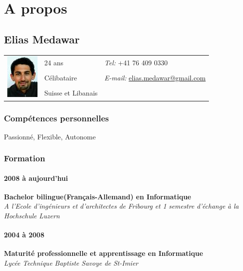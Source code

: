 \documentclass[12pt,a4paper,twoside]{report}
\begin{document}



\cleardoublepage
\chapter{A propos }

\cleardoublepage
\section{Elias Medawar}
	\begin{tabular}[t]{@{}p{2cm}p{5cm}p{8cm}}
	\multirow{3}{*}{\includegraphics[scale=0.8]{../comon/figures/elias.jpg} } & 24 ans & \textit{Tel:} +41 76 409 0330 \\[0.4cm]
	& Célibataire & \textit{E-mail:} \url{elias.medawar@gmail.com}\\[0.4cm]
  	& Suisse et Libanais\\[0.5cm]
	\end{tabular}
\subsection{Compétences personnelles}
\vspace{-0.4cm}
Passionné, Flexible, Autonome

\subsection{Formation}
\vspace{-0.4cm}
\subsubsection{2008 à aujourd'hui}
\vspace{-0.4cm}
\textbf{Bachelor \textbf{bilingue}(Français-Allemand) en Informatique}\\
\textit{A l'Ecole d'ingénieurs et d'architectes de Fribourg et 1 semestre d'échange à la Hochschule Luzern  }
 \vspace{-0.4cm}
 \subsubsection{2004 à 2008}
 \vspace{-0.4cm}
 \textbf{Maturité professionnelle et apprentissage en Informatique }\\
 \textit{Lycée Technique Baptiste Savoye de St-Imier }
 
\end{document}
